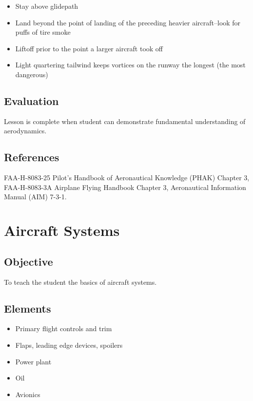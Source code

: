 \documentclass[twoside,openright]{report}
\begin{document}
\begin{itemize}
  \item Stay above glidepath

  \item Land beyond the point of landing of the preceding heavier aircraft--look
    for puffs of tire smoke

  \item Liftoff prior to the point a larger aircraft took off

  \item Light quartering tailwind keeps vortices on the runway the longest (the
    most dangerous)
\end{itemize}

\section{Evaluation}

Lesson is complete when student can demonstrate fundamental understanding of
aerodynamics.

\section{References}

FAA-H-8083-25 Pilot's Handbook of Aeronautical Knowledge (PHAK) Chapter 3,
FAA-H-8083-3A Airplane Flying Handbook Chapter 3, Aeronautical Information
Manual (AIM) 7-3-1.

\chapter{Aircraft Systems}

\section{Objective}

To teach the student the basics of aircraft systems.

\section{Elements}

\begin{itemize}
  \item Primary flight controls and trim
  \item Flaps, leading edge devices, spoilers
  \item Power plant
  \item Oil
  \item Avionics
\end{itemize}
\end{document}

